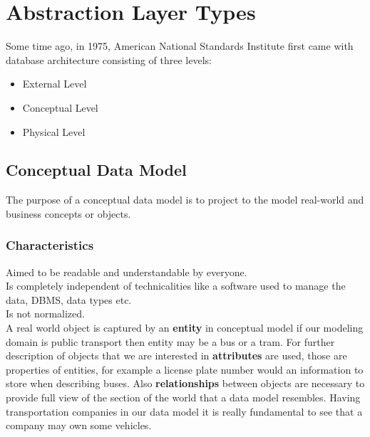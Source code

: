\section{Abstraction Layer Types}

Some time ago, in 1975, American National Standards Institute \cite{ANSIArchitecture75} first came with database architecture consisting of three levels:
\begin{itemize}
	\item External Level
	\item Conceptual Level
	\item Physical Level
\end{itemize}


\subsection{Conceptual Data Model}

The purpose of a conceptual data model is to project to the model real-world and business concepts or objects. \\

\subsubsection{Characteristics}
Aimed to be readable and understandable by everyone. \\
Is completely independent of technicalities like a software used to manage the data, DBMS, data types etc. \\
Is not normalized. \\

A real world object is captured by an \textbf{entity} in conceptual model if our modeling domain is public transport then entity may be a bus or a tram.
For further description of objects that we are interested in \textbf{attributes} are used, those are properties of entities, for example a license plate number would an information to store when describing buses.
Also \textbf{relationships} between objects are necessary to provide full view of the section of the world that a data model resembles. Having transportation companies in our data model it is really fundamental to see that a company may own some vehicles.


